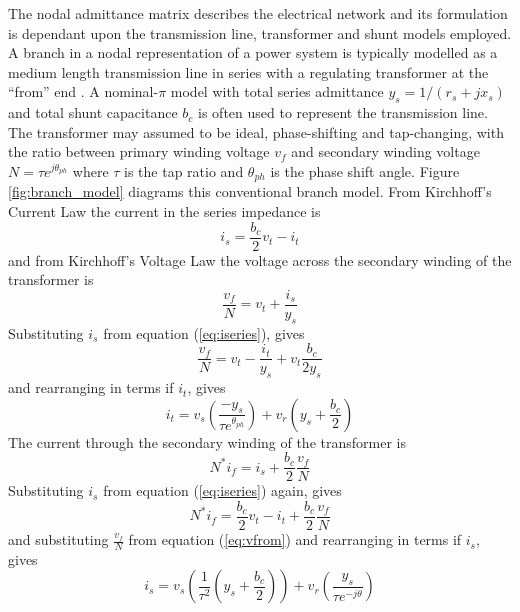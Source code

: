 The nodal admittance matrix describes the electrical network and its formulation
is dependant upon the transmission line, transformer and shunt models employed.
A branch in a nodal representation of a power system is typically modelled as a
medium length transmission line in series with a regulating transformer at the
``from'' end \cite[p.11]{crow:2009,pserc:mp_manual}. A nominal-$\pi$ model with
total series admittance $y_s = 1/(r_s+jx_s)$ and total shunt capacitance $b_c$ is
often used to represent the transmission line.  The transformer may assumed to
be ideal, phase-shifting and tap-changing, with the ratio between primary winding
voltage $v_{f}$ and secondary winding voltage $N = \tau e^{j\theta_{ph}}$ where
$\tau$ is the tap ratio and $\theta_{ph}$ is the phase shift angle. Figure
\ref{fig:branch_model} diagrams this conventional branch model.  From
Kirchhoff's Current Law the current in the series impedance is
\begin{equation}
\label{eq:iseries}
i_s = \frac{b_c}{2}v_t - i_t
\end{equation}
and from Kirchhoff's Voltage Law the voltage across the secondary winding of
the transformer is
\begin{equation}
\frac{v_{f}}{N} = v_t + \frac{i_s}{y_s}
\end{equation}
Substituting $i_s$ from equation (\ref{eq:iseries}), gives
\begin{equation}
\label{eq:vfrom}
\frac{v_{f}}{N} = v_t - \frac{i_t}{y_s} + v_t\frac{b_c}{2y_s}
\end{equation}
and rearranging in terms if $i_t$, gives
\begin{equation}
\label{eq:ito}
i_t = v_s \left( \frac{-y_s}{\tau e^{\theta_{ph}}} \right) +
v_r \left( y_s + \frac{b_c}{2} \right)
\end{equation}
The current through the secondary winding of the transformer is
\begin{equation}
N^*i_f = i_s + \frac{b_c}{2}\frac{v_{f}}{N}
\end{equation}
Substituting $i_s$ from equation (\ref{eq:iseries}) again, gives
\begin{equation}
N^*i_f = \frac{b_c}{2}v_t - i_t + \frac{b_c}{2}\frac{v_{f}}{N}
\end{equation}
and substituting $\frac{v_{f}}{N}$ from equation (\ref{eq:vfrom}) and
rearranging in terms if $i_s$, gives
\begin{equation}
\label{eq:ifrom}
i_s = v_s \left( \frac{1}{\tau^2} \left(y_s + \frac{b_c}{2}\right) \right) +
v_r \left(\frac{y_s}{\tau e^{-j\theta}}\right)
\end{equation}


